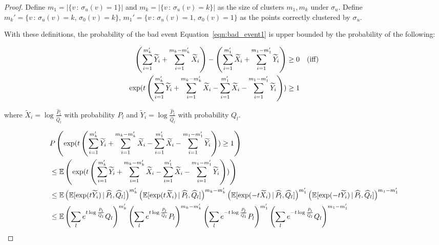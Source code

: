 \begin{proof}
Define $m_1 = |\{ v \,:\, \sigma_u(v) = 1 \}|$ and $m_k = | \{ v \,:\, \sigma_u(v) = k \}|$ as the size of clusters $m_1, m_k$ under $\sigma_u$. Define $m_k' = \{ v \,:\, \sigma_u(v) = k,\, \sigma_0(v) = k \}$, $m_1' = \{ v \,:\, \sigma_u(v) = 1 ,\, \sigma_0(v) = 1\}$ as the points correctly clustered by $\sigma_u$. 

With these definitions, the probability of the bad event Equation~\ref{eqn:bad_event1} is upper bounded by the probability of the following:

\begin{align*}
\left( \sum_{i=1}^{m_k'} \widetilde{Y}_i + \sum_{i=1}^{m_k - m'_k} \widetilde{X}_i \right) - 
\left( \sum_{i=1}^{m_1'} \widetilde{X}_i + \sum_{i=1}^{m_1 - m_1'} \widetilde{Y}_i  \right) &\geq 0  \quad \textrm{(iff)} \\
\exp( t \left( \sum_{i=1}^{m_k'} \widetilde{Y}_i + \sum_{i=1}^{m_k - m_k'} \widetilde{X}_i - 
     \sum_{i=1}^{m_1'}  \widetilde{X}_i - \sum_{i=1}^{m_1 - m_1'} \widetilde{Y}_i  \right) ) &\geq 1 
\end{align*}

 where $\tilde{X}_i = \log \frac{\hat{P}_l}{\hat{Q}_l}$ with probability $P_l$ and $\tilde{Y}_i = \log \frac{\hat{P}_l}{\hat{Q}_l}$ with probability $Q_l$. 



\begin{align*}
& P \left( \exp( t \left( \sum_{i=1}^{m_k'} \widetilde{Y}_i + \sum_{i=1}^{m_k - m_k'} \widetilde{X}_i- 
     \sum_{i=1}^{m_1'}  \widetilde{X}_i - \sum_{i=1}^{m_1 - m_1'} \widetilde{Y}_i  \right) ) \geq 1 \right) \\ 
&\leq {\mathbb E} \left( 
\exp( t \left( \sum_{i=1}^{m_k'} \widetilde{Y}_i + \sum_{i=1}^{m_k - m_k'} \widetilde{X}_i - 
     \sum_{i=1}^{m_1'}  \widetilde{X}_i - \sum_{i=1}^{m_1 - m_1'} \widetilde{Y}_i  \right) )
 \right) \\ 
&\leq {\mathbb E} \left( {\mathbb E}[\exp( t \widetilde{Y}_i) {\,|\,} \widehat{P}_l, \widehat{Q}_l] \right)^{m_k'} 
      \left( {\mathbb E}[ \exp(t \widetilde{X}_i ){\,|\,} \widehat{P}_l, \widehat{Q}_l] \right)^{m_k - m_k'}  
    \left( {\mathbb E}[ \exp( - t \widetilde{X}_i){\,|\,} \widehat{P}_l, \widehat{Q}_l] \right)^{m_1'} 
    \left( {\mathbb E}[ \exp( -t \widetilde{Y}_i ){\,|\,} \widehat{P}_l, \widehat{Q}_l] \right)^{m_1 - m_1'} \\
&\leq{\mathbb E} \left( \sum_l e^{t \log \frac{\widehat{P}_l}{\widehat{Q}_l} } Q_l \right)^{m_k'}  
      \left( \sum_l e^{t \log \frac{\widehat{P}_l}{\widehat{Q}_l}} P_l \right)^{m_k - m_k'} 
      \left( \sum_l e^{- t \log \frac{\widehat{P}_l}{\widehat{Q_l}} } P_l \right)^{m_1'}
     \left( \sum_l e^{-t \log \frac{\widehat{P}_l}{\widehat{Q}_l}} Q_l \right)^{m_1 - m_1'}
\end{align*}


\end{proof}

